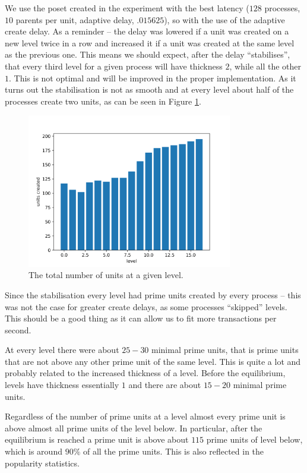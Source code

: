 \documentclass[a4paper,10pt]{article}
\begin{document}
		We use the poset created in the experiment with the best latency ($128$ processes, $10$ parents per unit, adaptive delay, $.015625$), so with the use of the adaptive create delay.
		As a reminder -- the delay was lowered if a unit was created on a new level twice in a row and increased it if a unit was created at the same level as the previous one.
		This means we should expect, after the delay ``stabilises'', that every third level for a given process will have thickness $2$, while all the other $1$.
		This is not optimal and will be improved in the proper implementation.
		As it turns out the stabilisation is not as smooth and at every level about half of the processes create two units, as can be seen in Figure \ref{fig:levels}.
		\begin{figure}[h]
			\centering
			\includegraphics[width=0.8\textwidth]{bar_plots/levels.png}
			\caption{The total number of units at a given level.}
			\label{fig:levels}
		\end{figure}
		Since the stabilisation every level had prime units created by every process -- this was not the case for greater create delays, as some processes ``skipped'' levels.
		This should be a good thing as it can allow us to fit more transactions per second.

		At every level there were about $25-30$ minimal prime units, that is prime units that are not above any other prime unit of the same level.
		This is quite a lot and probably related to the increased thickness of a level.
		Before the equilibrium, levels have thickness essentially $1$ and there are about $15-20$ minimal prime units.

		Regardless of the number of prime units at a level almost every prime unit is above almost all prime units of the level below.
		In particular, after the equilibrium is reached a prime unit is above about $115$ prime units of level below, which is around $90\%$ of all the prime units.
		This is also reflected in the popularity statistics.
\end{document}
